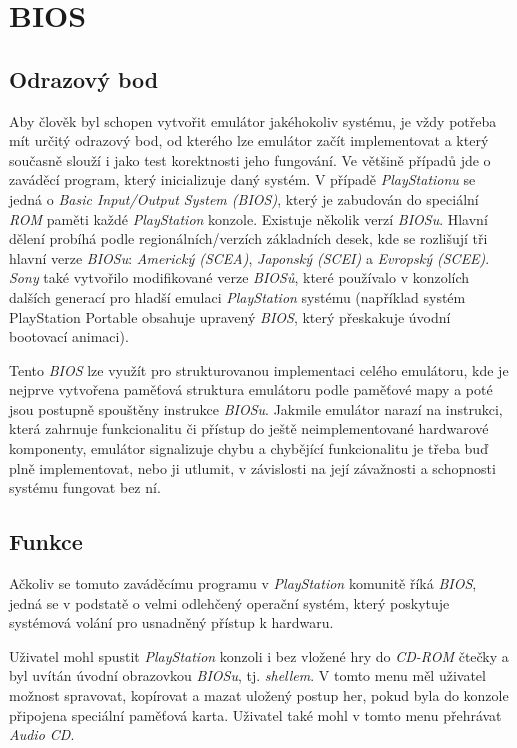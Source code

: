 \chapter{BIOS}

\section{Odrazový bod}

Aby člověk byl schopen vytvořit emulátor jakéhokoliv systému, je vždy potřeba mít určitý odrazový bod, od kterého lze emulátor
začít implementovat a který současně slouží i jako test korektnosti jeho fungování. Ve většině případů jde o zaváděcí
program, který inicializuje daný systém. V případě \textit{PlayStationu} se jedná o \textit{Basic Input/Output System (BIOS)},
který je zabudován do speciální \textit{ROM} paměti každé \textit{PlayStation} konzole. Existuje několik verzí \textit{BIOSu}.
Hlavní dělení probíhá podle regionálních/verzích základních desek, kde se rozlišují tři hlavní verze \textit{BIOSu}: \textit{Americký (SCEA)},
\textit{Japonský (SCEI)} a \textit{Evropský (SCEE)}. \textit{Sony} také vytvořilo modifikované verze \textit{BIOSů}, které používalo v konzolích
dalších generací pro hladší emulaci \textit{PlayStation} systému (například systém PlayStation Portable obsahuje upravený \textit{BIOS}, který
přeskakuje úvodní bootovací animaci).

Tento \textit{BIOS} lze využít pro strukturovanou implementaci celého emulátoru, kde je nejprve vytvořena paměťová struktura emulátoru
podle paměťové mapy a poté jsou postupně spouštěny instrukce \textit{BIOSu}. Jakmile emulátor narazí na instrukci, která zahrnuje funkcionalitu
či přístup do ještě neimplementované hardwarové komponenty, emulátor signalizuje chybu a chybějící funkcionalitu je třeba buď plně
implementovat, nebo ji utlumit, v závislosti na její závažnosti a schopnosti systému fungovat bez ní.

\section{Funkce}

Ačkoliv se tomuto zaváděcímu programu v \textit{PlayStation} komunitě říká \textit{BIOS}, 
jedná se v podstatě o velmi odlehčený operační systém, který poskytuje systémová volání pro usnadněný přístup k hardwaru.

Uživatel mohl spustit \textit{PlayStation} konzoli i bez vložené hry do \textit{CD-ROM} 
čtečky a byl uvítán úvodní obrazovkou \textit{BIOSu}, tj. \textit{shellem}. 
V tomto menu měl uživatel možnost spravovat, kopírovat a mazat uložený postup her, pokud byla do konzole připojena speciální paměťová karta. Uživatel také mohl
v tomto menu přehrávat \textit{Audio CD}.

